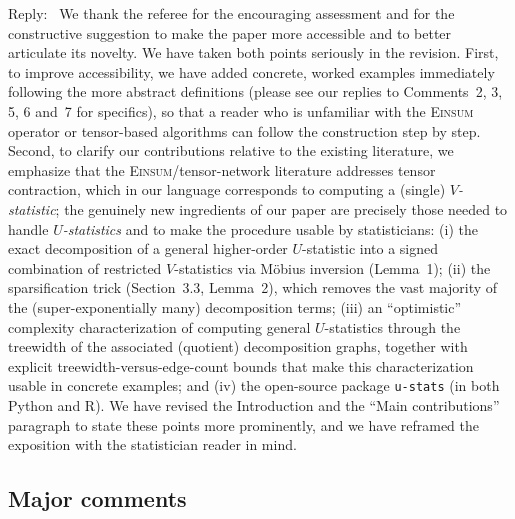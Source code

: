\documentclass[12pt]{article}
\newenvironment{reply}{\par\smallskip\noindent\color{blue}Reply:\ \ignorespaces}{\par}
\newcommand{\Einsum}{\textsc{Einsum}}
\begin{document}
\begin{reply}
We thank the referee for the encouraging assessment and for the constructive suggestion to make the paper more accessible and to better articulate its novelty. We have taken both points seriously in the revision. First, to improve accessibility, we have added concrete, worked examples immediately following the more abstract definitions (please see our replies to Comments~2, 3, 5, 6 and~7 for specifics), so that a reader who is unfamiliar with the \Einsum{} operator or tensor-based algorithms can follow the construction step by step. Second, to clarify our contributions relative to the existing literature, we emphasize that the \Einsum{}/tensor-network literature addresses tensor contraction, which in our language corresponds to computing a (single) \emph{$V$-statistic}; the genuinely new ingredients of our paper are precisely those needed to handle \emph{$U$-statistics} and to make the procedure usable by statisticians: (i) the exact decomposition of a general higher-order $U$-statistic into a signed combination of restricted $V$-statistics via M\"obius inversion (Lemma~1); (ii) the sparsification trick (Section~3.3, Lemma~2), which removes the vast majority of the (super-exponentially many) decomposition terms; (iii) an ``optimistic'' complexity characterization of computing general $U$-statistics through the treewidth of the associated (quotient) decomposition graphs, together with explicit treewidth-versus-edge-count bounds that make this characterization usable in concrete examples; and (iv) the open-source package \texttt{u-stats} (in both Python and R). We have revised the Introduction and the ``Main contributions'' paragraph to state these points more prominently, and we have reframed the exposition with the statistician reader in mind.
\end{reply}

\subsection*{Major comments}
\end{document}

